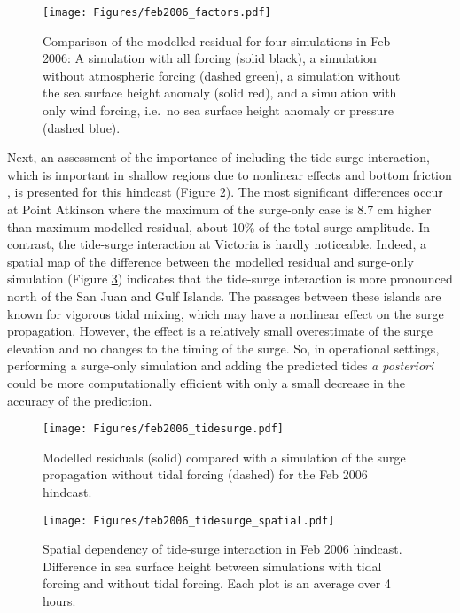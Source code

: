\documentclass{tATO2e}
\begin{document}
\begin{figure}
\centering
\texttt{[image: Figures/feb2006\_factors.pdf]}
\caption{Comparison of the modelled residual for four simulations in Feb 2006: A simulation with all forcing (solid black), a simulation without atmospheric forcing (dashed green), a simulation without the sea surface height anomaly (solid red), and a simulation with only wind forcing, i.e.\ no sea surface height anomaly or pressure (dashed blue). }
\label{fig:factors}
\end{figure}

Next, an assessment of the importance of including the tide-surge interaction, which is important in shallow regions due to nonlinear effects and bottom friction \citep{bernier2007tide}, is presented for this hindcast (Figure \ref{fig:tidesurge}). The most significant differences occur at Point Atkinson where the maximum of the surge-only case is 8.7 cm higher than maximum modelled residual, about 10\% of the total surge amplitude.  In contrast, the tide-surge interaction at Victoria is hardly noticeable. Indeed, a spatial map of the difference between the modelled residual and surge-only simulation (Figure \ref{fig:tidesurge_spatial}) indicates that the tide-surge interaction is more pronounced north of the San Juan and Gulf Islands. The passages between these islands are known for vigorous tidal mixing, which may have a nonlinear effect on the surge propagation. However, the effect is a relatively small overestimate of the surge elevation and no changes to the timing of the surge. So, in operational settings, performing a surge-only simulation and adding the predicted tides \textit{a posteriori} could be more computationally efficient with only a small decrease in the accuracy of the prediction. 

\begin{figure}
\centering
\texttt{[image: Figures/feb2006\_tidesurge.pdf]}
\caption{Modelled residuals (solid) compared with a simulation of the surge propagation without tidal forcing (dashed) for the Feb 2006 hindcast. }
\label{fig:tidesurge}
\end{figure}

\begin{figure}
\centering
\texttt{[image: Figures/feb2006\_tidesurge\_spatial.pdf]}
\caption{Spatial dependency of tide-surge interaction in Feb 2006 hindcast. Difference in sea surface height between simulations with tidal forcing and without tidal forcing. Each plot is an average over 4 hours. }
\label{fig:tidesurge_spatial}
\end{figure}
\end{document}
